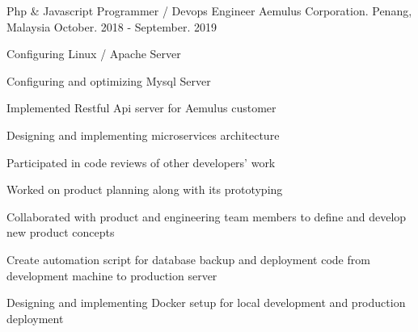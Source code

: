 

\begin{cventries}

  \cventry
    {Php \& Javascript Programmer / Devops Engineer} %
    {Aemulus Corporation.} %
    {Penang, Malaysia} %
    {October. 2018 - September. 2019} %
    {
      \begin{cvitems} %
      	\item Configuring Linux / Apache Server
        \item Configuring and optimizing Mysql Server
       	\item Implemented Restful Api server for Aemulus customer
       	\item Designing and implementing microservices architecture
        \item Participated in code reviews of other developers’ work
        \item Worked on product planning along with its prototyping
        \item Collaborated with product and engineering team members to define and develop new product concepts
        \item Create automation script for database backup and deployment code from development machine to production server
        \item Designing and implementing Docker setup for local development and production deployment
      \end{cvitems}
    }


\end{cventries}
